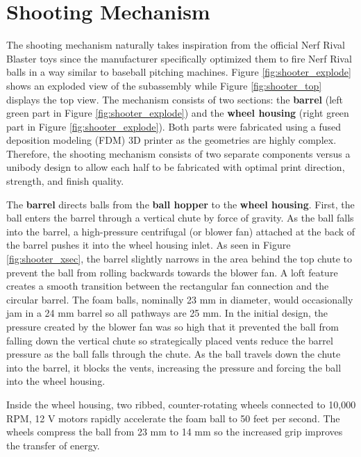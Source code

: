 \section{Shooting Mechanism}
The shooting mechanism naturally takes inspiration from the official Nerf Rival Blaster toys since the manufacturer specifically optimized them to fire Nerf Rival balls in a way similar to baseball pitching machines. Figure \ref{fig:shooter_explode} shows an exploded view of the subassembly while Figure \ref{fig:shooter_top} displays the top view. The mechanism consists of two sections: the \textbf{barrel} (left green part in Figure \ref{fig:shooter_explode}) and the \textbf{wheel housing} (right green part in Figure \ref{fig:shooter_explode}). Both parts were fabricated using a fused deposition modeling (FDM) 3D printer as the geometries are highly complex. Therefore, the shooting mechanism consists of two separate components versus a unibody design to allow each half to be fabricated with optimal print direction, strength, and finish quality. 

The \textbf{barrel} directs balls from the \textbf{ball hopper} to the \textbf{wheel housing}. First, the ball enters the barrel through a vertical chute by force of gravity. As the ball falls into the barrel, a high-pressure centrifugal (or blower fan) attached at the back of the barrel pushes it into the wheel housing inlet. As seen in Figure \ref{fig:shooter_xsec}, the barrel slightly narrows in the area behind the top chute to prevent the ball from rolling backwards towards the blower fan. A loft feature creates a smooth transition between the rectangular fan connection and the circular barrel. The foam balls, nominally 23 mm in diameter, would occasionally jam in a 24 mm barrel so all pathways are 25 mm. In the initial design, the pressure created by the blower fan was so high that it prevented the ball from falling down the vertical chute so strategically placed vents reduce the barrel pressure as the ball falls through the chute. As the ball travels down the chute into the barrel, it blocks the vents, increasing the pressure and forcing the ball into the wheel housing.

Inside the wheel housing, two ribbed, counter-rotating wheels connected to 10,000 RPM, 12 V motors rapidly accelerate the foam ball to 50 feet per second. The wheels compress the ball from 23 mm to 14 mm so the increased grip improves the transfer of energy. 

